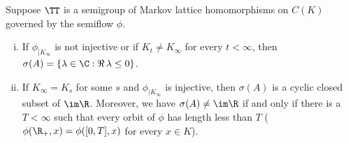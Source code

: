 \begin{theorem}\label{thm:b3-4.9}
	Suppose $\TT$ is a semigroup of Markov lattice homomorphisms on $C(K)$ governed by the semiflow $\phi$.
	\begin{enumerate}[(i)]
		\item 
		If $\phi_{|K_{\infty}}$ is not injective or if $K_{t} \neq K_{\infty}$ for every $t < \infty$, then $\sigma(A) = \{\lambda \in \C : \Re\,\lambda  \leq 0\}$.
		
		\item 
		If $K_{\infty} = K_{s}$ for some $s$ and $\phi_{|K_{\infty}}$ is injective, then $\sigma(A)$ is a cyclic closed subset of $\im \R$.
		Moreover, we have $\sigma(A) \neq \im\R$ if and only if there is a $T < \infty$ such that every orbit of $\phi$ has length less than $T$ (\ie $\phi(\R_{+},x) = \phi([0,T],x)$ for every $x \in K$).
	\end{enumerate}
\end{theorem}
%
%
